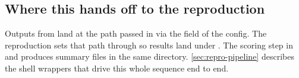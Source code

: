 \subsection{Where this hands off to the reproduction}
\label{sec:benchmark-handoff}

Outputs from  land at the path passed in via the  field of the config. The reproduction sets that path through  so results land under . The scoring step in  and  produces summary files in the same directory. \cref{sec:repro-pipeline} describes the shell wrappers that drive this whole sequence end to end.
